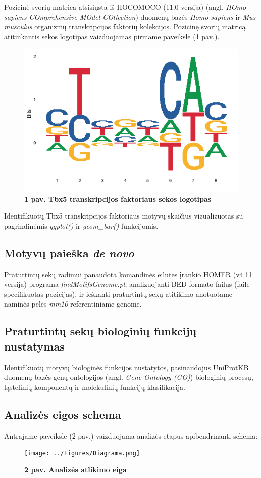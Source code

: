 \documentclass[12pt]{article}
\begin{document}
Pozicinė svorių matrica atsisiųsta iš HOCOMOCO\cite{HOCOMOCO} (11.0 versija)
(angl. \emph{HOmo sapiens COmprehensive MOdel COllection}) duomenų bazės
\emph{Homo sapiens} ir \emph{Mus musculus} organizmų transkripcijos faktorių
kolekcijos. Pozicinę svorių matricą atitinkantis sekos logotipas vaizduojamas
pirmame paveiksle (1 pav.).

\begin{figure}[htb]
    \begin{center}
        \includegraphics[width=0.4\linewidth]{../Figures/tbx5_motif.png}
        \vspace{-2\baselineskip}
        \caption*{\small\textbf{1 pav. Tbx5 transkripcijos faktoriaus
                                sekos logotipas}}
    \end{center}
\end{figure}

Identifikuotų Tbx5 transkripcijos faktoriaus motyvų skaičius vizualizuotas su
pagrindinėmis \emph{ggplot()} ir \emph{geom\_bar()} funkcijomis.

\subsection{Motyvų paieška \emph{de novo}}
Praturtintų sekų radimui panaudota komandinės eilutės įrankio HOMER\cite{HOMER}
(v4.11 versija) programa \emph{findMotifsGenome.pl}, analizuojanti BED formato
failus (faile specifikuotas pozicijas), ir ieškanti praturtintų sekų atitikimo
anotuotame naminės pelės \emph{mm10} referentiniame genome.

\subsection{Praturtintų sekų biologinių funkcijų nustatymas}
Identifikuotų motyvų biologinės funkcijos nustatytos, pasinaudojus
UniProtKB\cite{UNIPROT} duomenų bazės genų ontologijos (angl. \emph{Gene
Ontology (GO)}) biologinių procesų, ląstelinių komponentų ir molekulinių
funkcijų klasifikacija.

\subsection{Analizės eigos schema}
Antrajame paveiksle (2 pav.) vaizduojama analizės etapus apibendrinanti schema:
\begin{figure}[htb]
    \begin{center}
        \texttt{[image: ../Figures/Diagrama.png]}
        \vspace{-2\baselineskip}
        \caption*{\small\textbf{2 pav. Analizės atlikimo eiga}}
    \end{center}
\end{figure}
\end{document}
